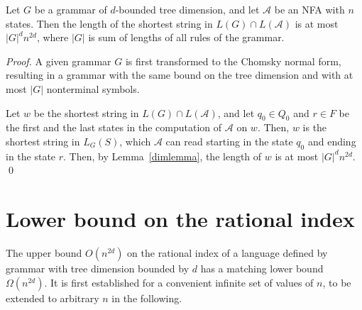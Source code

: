 \documentclass[runningheads]{llncs}
\begin{document}
\begin{theorem}
\label{oscbnddim}
Let $G$ be a grammar of $d$-bounded tree dimension,
and let $\mathcal{A}$ be an NFA with $n$ states.
Then the length of the shortest string in $L(G) \cap L(\mathcal{A})$ is at most $|G|^d n^{2d}$,
where $|G|$ is sum of lengths of all rules of the grammar.
\end{theorem}
\begin{proof}
A given grammar $G$ is first transformed to the Chomsky normal form,
resulting in a grammar with the same bound on the tree dimension
and with at most $|G|$ nonterminal symbols.

Let $w$ be the shortest string in $L(G) \cap L(\mathcal{A})$,
and let $q_0 \in Q_0$ and $r \in F$ be the first and the last states
in the computation of $\mathcal{A}$ on $w$.
Then, $w$ is the shortest string in $L_G(S)$,
which $\mathcal{A}$ can read starting in the state $q_0$
and ending in the state $r$.
Then, by Lemma~\ref{dimlemma},
the length of $w$ is at most $|G|^d n^{2d}$.
\qed
\end{proof}






\section{Lower bound on the rational index}\label{section_lower_bound} %

The upper bound $O(n^{2d})$ on the rational index of a language
defined by grammar with tree dimension bounded by $d$
has a matching lower bound $\Omega(n^{2d})$.
It is first established for a convenient infinite set of values of $n$,
to be extended to arbitrary $n$ in the following.
\end{document}
